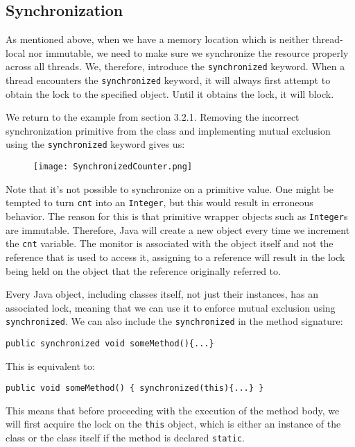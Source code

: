 \documentclass[main]{subfiles}
\begin{document}
\subsection{Synchronization}
As mentioned above, when we have a memory location which is neither thread-local nor immutable, we need to make sure we synchronize the resource properly across all threads. We, therefore, introduce the \texttt{synchronized} keyword. When a thread encounters the \texttt{synchronized} keyword, it will always first attempt to obtain the lock to the specified object. Until it obtains the lock, it will block.
\begin{example}
    We return to the example from section 3.2.1. Removing the incorrect synchronization primitive from the class and implementing mutual exclusion using the \texttt{synchronized} keyword gives us:
    \begin{figure}[H]
        \centering
        \texttt{[image: SynchronizedCounter.png]}
    \end{figure}
    \noindent Note that it's not possible to synchronize on a primitive value. One might be tempted to turn \texttt{cnt} into an \texttt{Integer}, but this would result in erroneous behavior. The reason for this is that primitive wrapper objects such as \texttt{Integer}s are immutable. Therefore, Java will create a new object every time we increment the \texttt{cnt} variable. The monitor is associated with the object itself and not the reference that is used to access it, assigning to a reference will result in the lock being held on the object that the reference originally referred to.
\end{example}
Every Java object, including classes itself, not just their instances, has an associated lock, meaning that we can use it to enforce mutual exclusion using \texttt{synchronized}. We can also include the \texttt{synchronized} in the method signature:
\begin{center}
    \texttt{public synchronized void someMethod()\{...\}}
\end{center}
This is equivalent to:
\begin{center}
    \texttt{public void someMethod() \{\ synchronized(this)\{...\}\ \}}
\end{center}
This means that before proceeding with the execution of the method body, we will first acquire the lock on the \texttt{this} object, which is either an instance of the class or the class itself if the method is declared \texttt{static}.\\[3mm]
\end{document}
